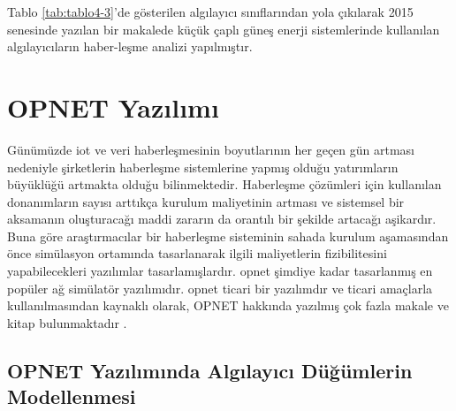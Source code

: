 Tablo \ref{tab:tablo4-3}’de gösterilen algılayıcı sınıflarından yola çıkılarak 2015 senesinde yazılan bir makalede küçük çaplı güneş enerji sistemlerinde kullanılan algılayıcıların haber-leşme analizi yapılmıştır. \cite{ahmed2015communication}

\section{OPNET Yazılımı}

Günümüzde \gls{iot} ve veri haberleşmesinin boyutlarının her geçen gün artması nedeniyle şirketlerin haberleşme sistemlerine yapmış olduğu yatırımların büyüklüğü artmakta olduğu bilinmektedir. Haberleşme çözümleri için kullanılan donanımların sayısı arttıkça kurulum maliyetinin artması ve sistemsel bir aksamanın oluşturacağı maddi zararın da orantılı bir şekilde artacağı aşikardır. Buna göre araştırmacılar bir haberleşme sisteminin sahada kurulum aşamasından önce simülasyon ortamında tasarlanarak ilgili maliyetlerin fizibilitesini yapabilecekleri yazılımlar tasarlamışlardır. \gls{opnet} şimdiye kadar tasarlanmış en popüler ağ simülatör yazılımıdır. \gls{opnet} ticari bir yazılımdır ve ticari amaçlarla kullanılmasından kaynaklı olarak, OPNET hakkında yazılmış çok fazla makale ve kitap bulunmaktadır \cite{lu2012unlocking}\cite{sethi2012practical}. 

\subsection{OPNET Yazılımında Algılayıcı Düğümlerin Modellenmesi}


